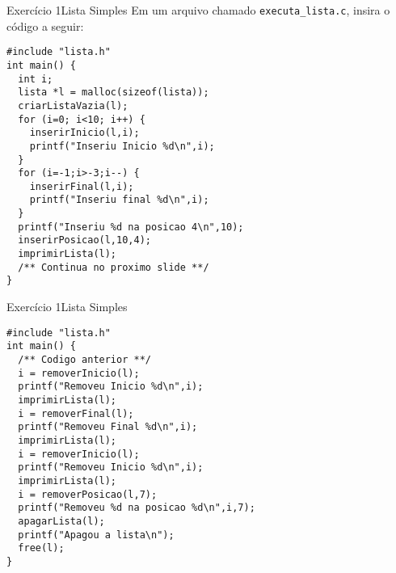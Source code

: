\documentclass[aspectratio=169]{beamer}
\begin{document}

\begin{frame}[fragile]{Exercício 1}{Lista Simples}
Em um arquivo chamado \verb|executa_lista.c|, insira  o código a seguir:
\begin{lstlisting}[style=CStyle]
#include "lista.h"
int main() {
  int i;
  lista *l = malloc(sizeof(lista));
  criarListaVazia(l);
  for (i=0; i<10; i++) {
    inserirInicio(l,i);
    printf("Inseriu Inicio %d\n",i);    
  }
  for (i=-1;i>-3;i--) {
    inserirFinal(l,i);
    printf("Inseriu final %d\n",i);
  }  
  printf("Inseriu %d na posicao 4\n",10);
  inserirPosicao(l,10,4);
  imprimirLista(l);
  /** Continua no proximo slide **/
}
\end{lstlisting}  
\end{frame}


\begin{frame}[fragile]{Exercício 1}{Lista Simples}
\begin{lstlisting}[style=CStyle]
#include "lista.h"
int main() {
  /** Codigo anterior **/
  i = removerInicio(l);
  printf("Removeu Inicio %d\n",i);
  imprimirLista(l);
  i = removerFinal(l);
  printf("Removeu Final %d\n",i);
  imprimirLista(l);
  i = removerInicio(l);
  printf("Removeu Inicio %d\n",i);
  imprimirLista(l);
  i = removerPosicao(l,7);
  printf("Removeu %d na posicao %d\n",i,7);
  apagarLista(l);
  printf("Apagou a lista\n");
  free(l);
}
\end{lstlisting}  
\end{frame}


\begin{frame}[plain]
  \titlepage
\end{frame}
\end{document}
